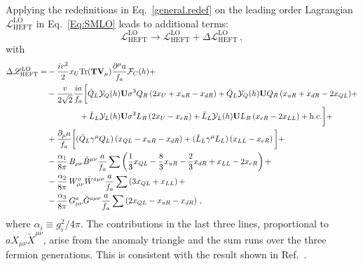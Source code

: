 \documentclass[11pt]{article}
\newcommand{\g}{\gamma}
\newcommand{\s}{\sigma}
\newcommand{\F}{\mathcal{F}}
\newcommand{\T}{\mathbf{T}}
\newcommand{\U}{\mathbf{U}}
\newcommand{\V}{\mathbf{V}}
\newcommand{\BBd}{B_{\mu\nu}}
\newcommand{\WWd}{W_{\mu\nu}}
\newcommand{\tr}{{\rm Tr}}
\renewcommand{\to}{\rightarrow}
\newcommand{\de}{\partial}
\newcommand{\hc}{\mathrm{h.c.}}
\newcommand{\beq}{\begin{equation}}
\newcommand{\eeq}{\end{equation}}
\renewcommand{\[}{\begin{equation}}
\renewcommand{\]}{\end{equation}}
\newcommand{\LL}{\mathscr{L}}
\begin{document}
\begin{appendices}
Applying the redefinitions in Eq.~\eqref{general.redef} on the leading order Lagrangian $\LL_{\text{HEFT}}^\text{LO}$ in Eq.~\eqref{Eq:SMLO} leads to additional terms:
\beq
\LL^{\text{LO}}_{\text{HEFT}}
\to\LL_{\text{HEFT}}^\text{LO} +\Delta\LL_{\text{HEFT}}^\text{LO}\,,
\eeq
with
\begin{equation}\label{L0_redefined}
\begin{split}
 \Delta\LL_{\text{HEFT}}^\text{LO}= &
 -\frac{iv^2}{2}x_U\tr(\T\V_\mu)\frac{\de^\mu a}{f_a}\F_C(h)+\\
 & -\frac{v}{2\sqrt2}\frac{ia}{f_a}\bigg[\bar{Q}_{L}
 \mathcal{Y}_Q(h) \U\s^3Q_{R}\,(2x_U+x_{u R}-x_{d R})+\bar{Q}_{L}\mathcal{Y}_Q(h)\U Q_{R}\,(x_{u R}+x_{d R}-2x_{Q L}) +\\
 &\qquad\qquad+\bar{L}_{L}\mathcal{Y}_L(h)\U\s^3L_{R}\, (2x_U-x_{e R})+ \bar{L}_{L}\mathcal{Y}_L(h)\U L_{R} \,(x_{e R}-2x_{LL}) +\hc\bigg]+\\   
 &+\frac{\de_\mu a}{f_a}\bigg[(\bar{Q}_{L}\g^\mu Q_{L})\left(x_{Q L}-x_{u R}-x_{d R}\right)+(\bar{L}_{L}\g^\mu L_{L})\left(x_{L L}-x_{e R}\right)\bigg]+\\
   &-\dfrac{\alpha_1}{8\pi}\,\BBd\tilde{B}^{\mu\nu}\frac{a}{f_a}\sum\left(\frac{1}{3}x_{QL}-\frac{8}{3}x_{uR}-\frac{2}{3}x_{dR}+x_{LL}-2x_{eR}\right)+\\
 &-\dfrac{\alpha_2}{8\pi}\, \WWd^a\tilde{W}^{a\mu\nu}\frac{a}{f_a}\sum\left(3x_{QL}+x_{LL}\right)+\\
 &-\dfrac{\alpha_3}{8\pi}\, G^a_{\mu\nu}\tilde{G}^{a\mu\nu}\frac{a}{f_a}\sum \left(2x_{QL}-x_{uR}-x_{dR}\right)\,,
\end{split}
\end{equation}
where $\alpha_i\equiv g_i^2/4\pi$. The contributions in the last three lines, proportional to $aX_{\mu\nu}\tilde{X}^{\mu\nu}$, arise from the anomaly triangle and the sum runs over the three fermion generations. This is consistent with the result shown in Ref.~\cite{Salvio:2013iaa}.


\end{appendices}
\end{document}
